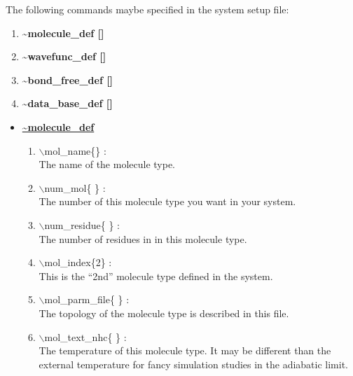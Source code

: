 The following commands maybe specified in the system setup file:
\begin{enumerate}
\LARGE
\item {\bf \~{}molecule\_def []}
\item {\bf \~{}wavefunc\_def []}
\item {\bf \~{}bond\_free\_def []}
\item {\bf \~{}data\_base\_def []}
\end{enumerate}

\begin{itemize}

\clearpage
\huge
\item[] \underline{\bf \~{}molecule\_def}
\begin{enumerate}

 \vspace{0.15in} \Large
 \item  $\backslash$mol\_name\{\} : \\
    \large
   The name of the molecule type.

 \vspace{0.15in} \Large
 \item  $\backslash$num\_mol\{ \} : \\ 
    \large
   The number of this molecule type you want in your system.

 \vspace{0.15in} \Large
 \item  $\backslash$num\_residue\{ \} : \\
    \large
   The number of residues in in this molecule type.

 \vspace{0.15in} \Large
 \item  $\backslash$mol\_index\{2\} : \\ 
    \large
   This is the ``2nd'' molecule type defined in the system.

 \vspace{0.15in} \Large
 \item  $\backslash$mol\_parm\_file\{ \} : \\
    \large
   The topology of the molecule type is described in this file.

 \vspace{0.15in} \Large
 \item  $\backslash$mol\_text\_nhc\{ \} : \\
    \large
   The temperature of this molecule type. It may be different than the
   external temperature for fancy simulation studies in the adiabatic limit.


\end{enumerate}
\end{itemize}
